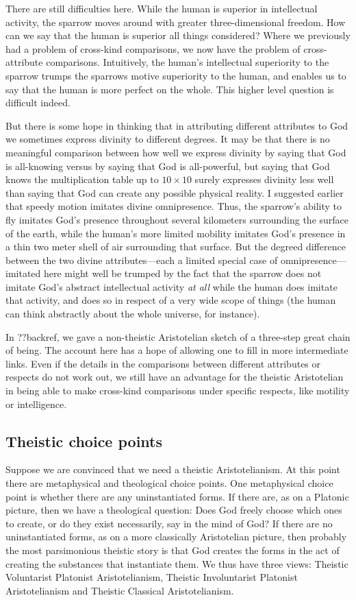 There are still difficulties here. While the human is superior in intellectual activity, the sparrow moves around
with greater three-dimensional freedom. How can we say that the human is superior all things considered? Where we
previously had a problem of cross-kind comparisons, we now have the problem of cross-attribute comparisons. 
Intuitively, the human's intellectual superiority to the sparrow trumps the sparrows motive superiority to the
human, and enables us to say that the human is more perfect on the whole. This higher level question is difficult
indeed. 

But there is some hope in thinking that in attributing different attributes to God we sometimes express divinity
to different degrees. It may be that there is no meaningful comparison between how well we express divinity by
saying that God is all-knowing versus by saying that God is all-powerful, but saying that God knows the
multiplication table up to $10\times 10$ surely expresses divinity less well than saying that God can create any
possible physical reality. I suggested earlier that speedy motion imitates divine omnipresence. Thus, the sparrow's
ability to fly imitates God's presence throughout several kilometers surrounding the surface of the earth, while
the human's more limited mobility imitates God's presence in a thin two meter shell of air surrounding that surface.
But the degreed difference between the two divine attributes---each a limited special case of omnipresence---imitated here 
might well be trumped by the fact that the sparrow does not imitate God's abstract intellectual activity \textit{at all}
while the human does imitate that activity, and does so in respect of a very wide scope of things (the human can think
abstractly about the whole universe, for instance). 

In ??backref, we gave a non-theistic Aristotelian sketch of a three-step great chain of being. The account here has
a hope of allowing one to fill in more intermediate links.
Even if the details in the comparisons between different attributes or respects do not work out, we still have an advantage 
for the theistic Aristotelian in being able to make cross-kind comparisons under specific respects, like motility or intelligence.

\subsection{Theistic choice points}
Suppose we are convinced that we need a theistic Aristotelianism.
At this point there are metaphysical and theological choice points. One metaphysical choice point is whether there are any
uninstantiated forms. If there are, as on a Platonic picture, then we have a theological question: Does God freely choose which ones
to create, or do they exist necessarily, say in the mind of God? If there are no uninstantiated forms, as on a more classically 
Aristotelian picture, then probably the most parsimonious theistic story is that God creates the forms in the act of creating the substances 
that instantiate them. We thus have three views: Theistic Voluntarist Platonist Aristotelianism, Theistic Involuntarist Platonist Aristotelianism
and Theistic Classical Aristotelianism.


